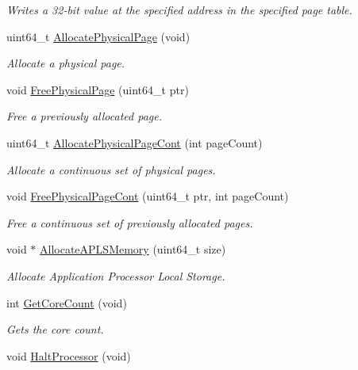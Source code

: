 \begin{DoxyCompactItemize}
\begin{DoxyCompactList}\small\item\em Writes a 32-\/bit value at the specified address in the specified page table. \end{DoxyCompactList}\item 
uint64\+\_\+t \hyperlink{group__memory__hal_gac1f7c0b6cfea48c7e5a85650b859d4cf}{Allocate\+Physical\+Page} (void)
\begin{DoxyCompactList}\small\item\em Allocate a physical page. \end{DoxyCompactList}\item 
void \hyperlink{group__memory__hal_ga7a16691da55bbba1a24046a39691feb6}{Free\+Physical\+Page} (uint64\+\_\+t ptr)
\begin{DoxyCompactList}\small\item\em Free a previously allocated page. \end{DoxyCompactList}\item 
uint64\+\_\+t \hyperlink{group__memory__hal_ga4252d21415bbdba613651dd74bf5ff7d}{Allocate\+Physical\+Page\+Cont} (int page\+Count)
\begin{DoxyCompactList}\small\item\em Allocate a continuous set of physical pages. \end{DoxyCompactList}\item 
void \hyperlink{group__memory__hal_gaa3d1107b7812b8e5e931d39d162d1e31}{Free\+Physical\+Page\+Cont} (uint64\+\_\+t ptr, int page\+Count)
\begin{DoxyCompactList}\small\item\em Free a continuous set of previously allocated pages. \end{DoxyCompactList}\item 
void $\ast$ \hyperlink{group__memory__hal_gad4d70c510c0ceaaba7f3019a6639adf7}{Allocate\+A\+P\+L\+S\+Memory} (uint64\+\_\+t size)
\begin{DoxyCompactList}\small\item\em Allocate Application Processor Local Storage. \end{DoxyCompactList}\item 
int \hyperlink{group__memory__hal_ga3022d9b7eccca6a47a59574f3504eefa}{Get\+Core\+Count} (void)
\begin{DoxyCompactList}\small\item\em Gets the core count. \end{DoxyCompactList}\item 
void \hyperlink{group__memory__hal_ga5cc9503ace8d3944b2fe575e29acd4c9}{Halt\+Processor} (void)\hypertarget{group__memory__hal_ga5cc9503ace8d3944b2fe575e29acd4c9}{}\label{group__memory__hal_ga5cc9503ace8d3944b2fe575e29acd4c9}


\end{DoxyCompactItemize}
